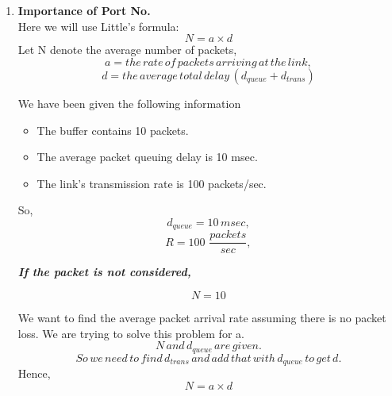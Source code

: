 \documentclass[12pt]{article}
\begin{document}
\section{}
    \begin{enumerate}[label=(\alph*)]
    
    \item \textbf{Importance of Port No.} \\
    Here we will use Little’s formula:
    \begin{equation*}
            N = a \times d
    \end{equation*} 
    Let N denote the average number of packets,
    \begin{equation*}
        a = the \, rate \, of \, packets \, arriving \, at \, the \, link,
    \end{equation*}
    \begin{equation*}
        d = the \, average \, total \, delay \, (d_{queue} + d_{trans})
    \end{equation*}
    
    We have been given the following information 
    \begin{itemize}
        \item The buffer contains 10 packets.
        \item The average packet queuing delay is 10 msec.
        \item The link’s transmission rate is 100 packets/sec.
    \end{itemize}
    
    So,
    \begin{equation*}
        d_{queue} = 10 \, msec,
    \end{equation*}
    \begin{equation*}
        R = 100 \, \, \frac{packets}{sec},
    \end{equation*}
    
    \textit{\textbf{If the  packet is  not considered,}}
    
    \begin{equation*}
        N = 10 
    \end{equation*}
    
    We want to find the average packet arrival rate assuming there is no packet loss. 
    We are trying to solve this problem for a. 
    \begin{equation*}
        N \, and \, d_{queue} \, are \, given.
    \end{equation*}
    \begin{equation*}
        So \, we \, need \, to \, find \, d_{trans} \, and \, add \, that \, with \, d_{queue} \, to \, get \, d.
    \end{equation*}
    Hence, 
    \begin{equation*}
        N = a \times d
    \end{equation*}
    

\end{enumerate}
\end{document}
